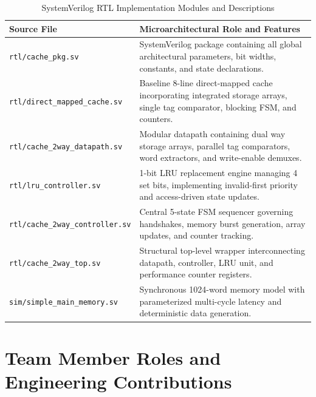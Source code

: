 \documentclass[conference]{IEEEtran}
\begin{document}
\begin{table}[htbp]
\caption{SystemVerilog RTL Implementation Modules and Descriptions}
\label{tab:rtl_modules}
\centering
\begin{tabularx}{\columnwidth}{lX}
\toprule
\textbf{Source File} & \textbf{Microarchitectural Role and Features} \\
\midrule
\texttt{rtl/cache\_pkg.sv} & SystemVerilog package containing all global architectural parameters, bit widths, constants, and state declarations. \\
\addlinespace[0.3em]
\texttt{rtl/direct\_mapped\_cache.sv} & Baseline 8-line direct-mapped cache incorporating integrated storage arrays, single tag comparator, blocking FSM, and counters. \\
\addlinespace[0.3em]
\texttt{rtl/cache\_2way\_datapath.sv} & Modular datapath containing dual way storage arrays, parallel tag comparators, word extractors, and write-enable demuxes. \\
\addlinespace[0.3em]
\texttt{rtl/lru\_controller.sv} & 1-bit LRU replacement engine managing 4 set bits, implementing invalid-first priority and access-driven state updates. \\
\addlinespace[0.3em]
\texttt{rtl/cache\_2way\_controller.sv} & Central 5-state FSM sequencer governing handshakes, memory burst generation, array updates, and counter tracking. \\
\addlinespace[0.3em]
\texttt{rtl/cache\_2way\_top.sv} & Structural top-level wrapper interconnecting datapath, controller, LRU unit, and performance counter registers. \\
\addlinespace[0.3em]
\texttt{sim/simple\_main\_memory.sv} & Synchronous 1024-word memory model with parameterized multi-cycle latency and deterministic data generation. \\
\bottomrule
\end{tabularx}
\end{table}

\section{Team Member Roles and Engineering Contributions}
\label{sec:contributions}
\end{document}
